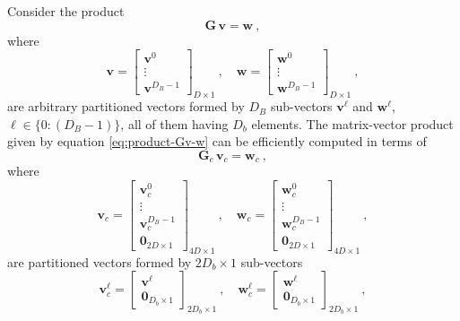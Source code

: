 Consider the product
\begin{equation}
	\mathbf{G} \, \mathbf{v} = \mathbf{w} \: ,
	\label{eq:product-Gv-w}
\end{equation}
where 
\begin{equation}
	\mathbf{v} = \begin{bmatrix}
		\mathbf{v}^{0} \\ \vdots \\ \mathbf{v}^{D_{B}-1}
	\end{bmatrix}_{D \times 1} \: , \quad 
	\mathbf{w} = \begin{bmatrix}
		\mathbf{w}^{0} \\ \vdots \\ \mathbf{w}^{D_{B}-1}
	\end{bmatrix}_{D \times 1} \: ,
	\label{eq:vectors-v-w}
\end{equation}
are arbitrary partitioned vectors formed by $D_{B}$ sub-vectors $\mathbf{v}^{\ell}$ and $\mathbf{w}^{\ell}$,
$\ell \in \{ 0 : (D_{B} - 1) \}$, all of them having $D_{b}$ elements.
The matrix-vector product given by equation \ref{eq:product-Gv-w} can be efficiently computed
in terms of
\begin{equation}
	\mathbf{G}_{c} \, \mathbf{v}_{c} = \mathbf{w}_{c} \: ,
	\label{eq:aux-BCCB-system}
\end{equation}
where 
\begin{equation}
	\mathbf{v}_{c} = \begin{bmatrix}
		\mathbf{v}_{c}^{0} \\ \vdots \\ \mathbf{v}_{c}^{D_{B}-1} \\ \mathbf{0}_{2D \times 1}
	\end{bmatrix}_{4D \times 1} \: , \quad 
	\mathbf{w}_{c} = \begin{bmatrix}
		\mathbf{w}_{c}^{0} \\ \vdots \\ \mathbf{w}_{c}^{D_{B}-1} \\ \mathbf{0}_{2D \times 1}
	\end{bmatrix}_{4D \times 1} \: ,
	\label{eq:vectors-vc-wc}
\end{equation}
are partitioned vectors formed by $2D_{b} \times 1$ sub-vectors
\begin{equation}
	\mathbf{v}_{c}^{\ell} = \begin{bmatrix}
		\mathbf{v}^{\ell} \\ \mathbf{0}_{D_{b} \times 1}
	\end{bmatrix}_{2D_{b} \times 1} \: , \quad 
	\mathbf{w}_{c}^{\ell} = \begin{bmatrix}
		\mathbf{w}^{\ell} \\ \mathbf{0}_{D_{b} \times 1}
	\end{bmatrix}_{2D_{b} \times 1} \: ,
	\label{eq:vectors-vc-wc-ell}
\end{equation}
